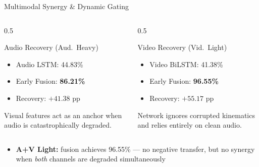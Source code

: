 \documentclass{beamer}
\begin{document}
\begin{frame}{Multimodal Synergy \& Dynamic Gating}
  \begin{columns}
    \begin{column}{0.5\textwidth}
      \begin{block}{Audio Recovery (Aud.\ Heavy)}
        \begin{itemize}
          \item Audio LSTM: \alert{44.83\%}
          \item Early Fusion: \textbf{86.21\%}
          \item Recovery: $\mathbf{+41.38}$ pp
        \end{itemize}
        Visual features act as an anchor when audio is catastrophically degraded.
      \end{block}
    \end{column}
    \begin{column}{0.5\textwidth}
      \begin{block}{Video Recovery (Vid.\ Light)}
        \begin{itemize}
          \item Video BiLSTM: \alert{41.38\%}
          \item Early Fusion: \textbf{96.55\%}
          \item Recovery: $\mathbf{+55.17}$ pp
        \end{itemize}
        Network ignores corrupted kinematics and relies entirely on clean audio.
      \end{block}
    \end{column}
  \end{columns}
  \vspace{0.5em}
  \begin{itemize}
    \item \textbf{A+V Light:} fusion achieves 96.55\% --- no negative transfer, but no synergy when \emph{both} channels are degraded simultaneously
  \end{itemize}
\end{frame}
\end{document}
